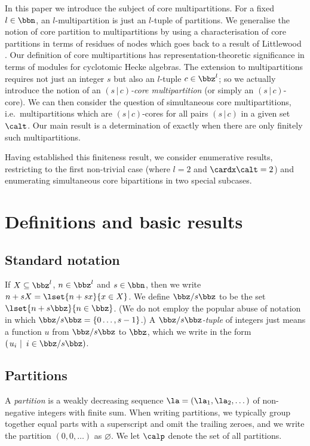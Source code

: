 \documentclass[a4paper, 11pt, twoside]{article}
\begin{document}
In this paper we introduce the subject of core multipartitions. For a fixed $l\in\bbn$, an $l$-multipartition is just an $l$-tuple of partitions. We generalise the notion of core partition to multipartitions by using a characterisation of core partitions in terms of residues of nodes which goes back to a result of Littlewood \cite{litt}. Our definition of core multipartitions has representation-theoretic significance in terms of modules for cyclotomic Hecke algebras. The extension to multipartitions requires not just an integer $s$ but also an $l$-tuple $c\in\bbz^l$; so we actually introduce the notion of an \emph{$(s\,|\,c)$-core multipartition} (or simply an $(s\,|\,c)$-core). We can then consider the question of simultaneous core multipartitions, i.e.\ multipartitions which are $(s\,|\,c)$-cores for all pairs $(s\,|\,c)$ in a given set $\calt$. Our main result is a determination of exactly when there are only finitely such multipartitions.

Having established this finiteness result, we consider enumerative results, restricting to the first non-trivial case (where $l=2$ and $\cardx\calt=2$) and enumerating simultaneous core bipartitions in two special subcases.

\section{Definitions and basic results}


\subsection{Standard notation}

If $X\subseteq\bbz^l$, $n\in\bbz^l$ and $s\in\bbn$, then we write $n+sX=\lset{n+sx}{x\in X}$. We define $\zsz$ to be the set $\lset{n+s\bbz}{n\in\bbz}$. (We do not employ the popular abuse of notation in which $\zsz=\{0\dots,s-1\}$.) A \emph{$\zsz$-tuple} of integers just means a function $u$ from $\zsz$ to $\bbz$, which we write in the form $\ltup{u_i}{i\in\zsz}$.

\subsection{Partitions}

A \emph{partition} is a weakly decreasing sequence $\la=(\la_1,\la_2,\dots)$ of non-negative integers with finite sum. When writing partitions, we typically group together equal parts with a superscript and omit the trailing zeroes, and we write the partition $(0,0,\dots)$ as $\varnothing$. We let $\calp$ denote the set of all partitions.
\end{document}
